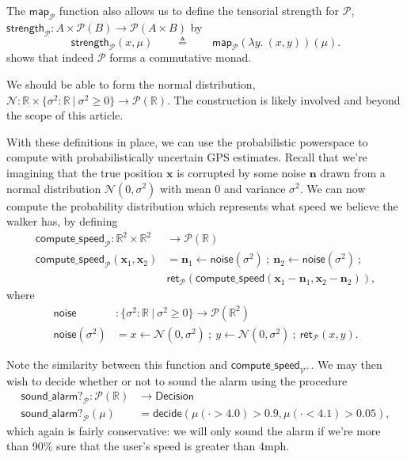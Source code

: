\documentclass{article}           %
\newcommand{\R}{\mathbb{R}}
\newcommand{\fun}[2]{\lambda {#1}.\  {#2}}
\newcommand{\suchthat}{\ |\ }
\newcommand{\Prob}{\mathcal{P}}
\newcommand{\Viet}{{\mathcal{V}^+}}
\newcommand{\map}[1]{\mathsf{map}_{#1}}
\newcommand{\ret}[1]{\mathsf{ret}_{#1}}
\newcommand{\ve}[1]{\mathbf{#1}}
\newcommand{\then}{\ ;\ }
\newcommand{\defeq}{\triangleq}
\begin{document}
The $\map{\Prob}$ function also allows us to define the tensorial strength for $\Prob$, $\mathsf{strength}_\Prob : A \times \Prob(B) \to \Prob(A \times B)$ by
\[
\mathsf{strength}_\Prob(x, \mu)
\qquad \defeq \qquad
\map{\Prob}(\fun{y}{(x, y)})(\mu).
\]
\cite{vickers2011} shows that indeed $\Prob$ forms a commutative monad.

We should be able to form the normal distribution, $\mathcal{N} : \R \times \{ \sigma^2 : \R \suchthat \sigma^2 \ge 0 \} \to \Prob(\R)$. The construction is likely involved and beyond the scope of this article.

With these definitions in place, we can use the probabilistic powerspace to compute with probabilistically uncertain GPS estimates. Recall that we're imagining that the true position $\ve{x}$ is corrupted by some noise $\ve{n}$ drawn from a normal distribution $\mathcal{N}(0, \sigma^2)$ with mean $0$ and variance $\sigma^2$. We can now compute the probability distribution which represents what speed we believe the walker has, by defining
\begin{align*}
\mathsf{compute\_speed}_\Prob : \R^2 \times \R^2 &\to \Prob(\R)
\\ \mathsf{compute\_speed}_\Prob (\ve{x}_1, \ve{x}_2) &= 
  \ve{n}_1 \leftarrow \mathsf{noise}(\sigma^2)
  \then
  \ve{n}_2 \leftarrow \mathsf{noise}(\sigma^2)
  \then
  \\ &\ret{\Prob} \left( \mathsf{compute\_speed}(\ve{x}_1 - \ve{n}_1, \ve{x}_2 - \ve{n}_2) \right),
\end{align*}
where
\begin{align*}
\mathsf{noise} &: \{ \sigma^2 : \R \suchthat \sigma^2 \ge 0 \} \to \Prob \left( \R^2 \right)
\\ \mathsf{noise}(\sigma^2) &= 
  x \leftarrow \mathcal{N}(0, \sigma^2)
  \then
  y \leftarrow \mathcal{N}(0, \sigma^2)
  \then
  \ret{\Prob}(x, y).
\end{align*}

Note the similarity between this function and $\mathsf{compute\_speed}_\Viet$. We may then wish to decide whether or not to sound the alarm using the procedure
\begin{align*}
\mathsf{sound\_alarm?}_\Prob : \Prob(\R) &\to \mathsf{Decision}
\\ \mathsf{sound\_alarm?}_\Prob(\mu) &= 
  \mathsf{decide}(\mu(\cdot > 4.0) > 0.9 , \mu(\cdot < 4.1) > 0.05),
\end{align*}
which again is fairly conservative: we will only sound the alarm if we're more than 90\% sure that the user's speed is greater than 4mph.
\end{document}
